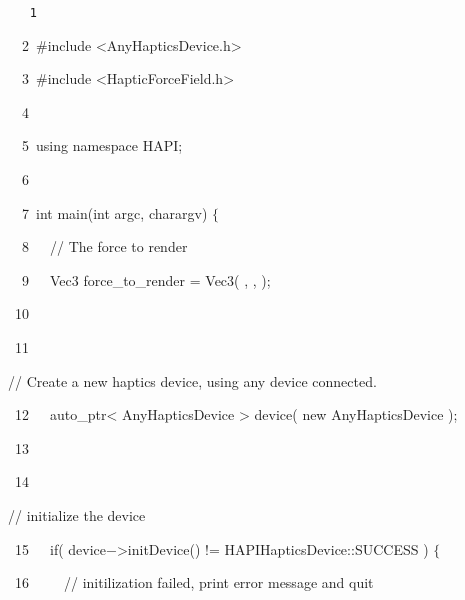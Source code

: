 {
\tt
{\hlstd }{\hlline \ \ \ \ 1\ }\leavevmode\par
{\hlline \ \ \ \ 2\ }{\hldir \#include $\mathord{<}$AnyHapticsDevice.h$\mathord{>}$}\leavevmode\par
{\hlline \ \ \ \ 3\ }{\hlstd }{\hldir \#include $\mathord{<}$HapticForceField.h$\mathord{>}$}\leavevmode\par
{\hlline \ \ \ \ 4\ }{\hlstd }\leavevmode\par
{\hlline \ \ \ \ 5\ }{\hlkwa using namespace }{\hlstd HAPI}{\hlsym ;}\leavevmode\par
{\hlline \ \ \ \ 6\ }{\hlstd }\leavevmode\par
{\hlline \ \ \ \ 7\ }{\hlkwb int }{\hlstd }{\hlkwd main}{\hlstd }{\hlsym (}{\hlstd }{\hlkwb int }{\hlstd argc}{\hlsym , }{\hlstd }{\hlkwb char}{\hlstd }{\hlsym * }{\hlstd argv}{\hlsym []) $\{$}\leavevmode\par
{\hlline \ \ \ \ 8\ }{\hlstd }{\hlstd\ \ }{\hlstd }{\hlslc // The force to render}\leavevmode\par
{\hlline \ \ \ \ 9\ }{\hlstd }{\hlstd\ \ }{\hlstd Vec3 force\_{}to\_{}render }{\hlsym $\mathord{=}$ }{\hlstd }{\hlkwd Vec3}{\hlstd }{\hlsym ( }{\hlstd }{}{\hlstd }{\hlsym , }{\hlstd }{}{\hlstd }{\hlsym , }{\hlstd }{ }{\hlstd }{\hlsym );}\leavevmode\par
{\hlline \ \ \ 10\ }{\hlstd \leavevmode\par
{\hlline \ \ \ 11\ }}{\hlstd\ \ }{\hlstd }{\hlslc // Create a new haptics device, using any device connected.}\leavevmode\par
{\hlline \ \ \ 12\ }{\hlstd }{\hlstd\ \ }{\hlstd auto\_{}ptr}{\hlsym $\mathord{<}$ }{\hlstd AnyHapticsDevice }{\hlsym $\mathord{>}$ }{\hlstd }{\hlkwd device}{\hlstd }{\hlsym ( }{\hlstd }{\hlkwa new }{\hlstd AnyHapticsDevice }{\hlsym );}\leavevmode\par
{\hlline \ \ \ 13\ }{\hlstd \leavevmode\par
{\hlline \ \ \ 14\ }}{\hlstd\ \ }{\hlstd }{\hlslc // initialize the device}\leavevmode\par
{\hlline \ \ \ 15\ }{\hlstd }{\hlstd\ \ }{\hlstd }{\hlkwa if}{\hlstd }{\hlsym ( }{\hlstd device}{\hlsym $\mathord{-}$$\mathord{>}$}{\hlstd }{\hlkwd initDevice}{\hlstd }{\hlsym () !$\mathord{=}$ }{\hlstd HAPIHapticsDevice}{\hlsym ::}{\hlstd SUCCESS }{\hlsym ) $\{$}\leavevmode\par
{\hlline \ \ \ 16\ }{\hlstd }{\hlstd\ \ \ \ }{\hlstd }{\hlslc // initilization failed, print error message and quit}\leavevmode\par
}
